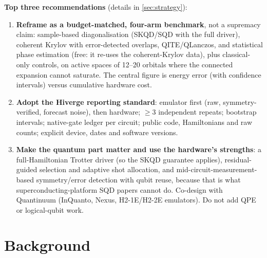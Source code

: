\documentclass[11pt,a4paper]{article}
\begin{document}
\textbf{Top three recommendations} (details in \cref{sec:strategy}):
\begin{enumerate}
\item \textbf{Reframe as a budget-matched, four-arm benchmark}, not a supremacy claim: sample-based diagonalisation (SKQD/SQD with the full driver), coherent Krylov with error-detected overlaps, QITE/QLanczos, and statistical phase estimation (free: it re-uses the coherent-Krylov data), plus classical-only controls, on active spaces of 12--20 orbitals where the connected expansion cannot saturate. The central figure is energy error (with confidence intervals) versus cumulative hardware cost.
\item \textbf{Adopt the Hiverge reporting standard}: emulator first (raw, symmetry-verified, forecast noise), then hardware; $\ge 3$ independent repeats; bootstrap intervals; native-gate ledger per circuit; public code, Hamiltonians and raw counts; explicit device, dates and software versions.
\item \textbf{Make the quantum part matter and use the hardware's strengths}: a full-Hamiltonian Trotter driver (so the SKQD guarantee applies), residual-guided selection and adaptive shot allocation, and mid-circuit-measurement-based symmetry/error detection with qubit reuse, because that is what superconducting-platform SQD papers cannot do. Co-design with Quantinuum (InQuanto, Nexus, H2-1E/H2-2E emulators). Do not add QPE or logical-qubit work.
\end{enumerate}

\clearpage
{\setlength{\parskip}{0pt}\tableofcontents}
\clearpage

\part{Background}
\end{document}
